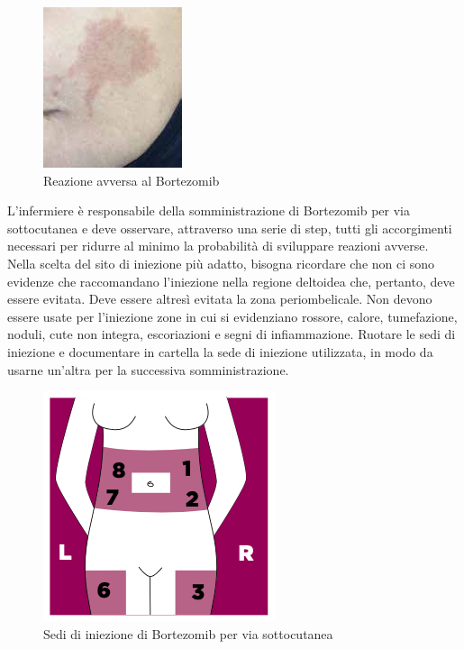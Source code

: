 \begin{figure}[H]
    \begin{center}
    \includegraphics[width=0.3\columnwidth]{img/bortezomibreaction2.jpeg}
    \vspace{-3mm}
    \end{center}
    \caption{ Reazione avversa al Bortezomib
    \cite{BORTNURSES}}
   
\end{figure}

L’infermiere è responsabile della somministrazione di Bortezomib per via sottocutanea e deve osservare,
attraverso una serie di step, tutti gli accorgimenti necessari per ridurre al minimo la probabilità di sviluppare 
reazioni avverse.\\ 
Nella scelta del sito di iniezione più adatto, bisogna ricordare che non ci sono evidenze che raccomandano l’iniezione 
nella regione deltoidea che, pertanto, deve essere evitata. 
Deve essere altresì evitata la zona periombelicale.
Non devono essere usate per l'iniezione zone in cui si evidenziano rossore, calore, 
tumefazione, noduli, cute non integra, escoriazioni e segni di infiammazione. 
Ruotare le sedi di iniezione e documentare in cartella la sede di iniezione utilizzata, in modo da usarne 
un’altra per la successiva somministrazione\cite{BORTNURSES}.

\begin{figure}[H]
    \begin{center}
    \includegraphics[width=0.3\columnwidth]{img/SEDI.png}
    \vspace{-3mm}
    \end{center}
    \caption{ Sedi di iniezione di Bortezomib per via sottocutanea
    \cite{BORTEZOMIB}}

\end{figure}

